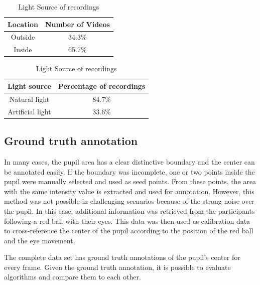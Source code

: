     \begin{table}[h]
      \centering 
      \begin{minipage}{0.7\textwidth}
        \centering
        \begin{tabular}{|c|c|}
          \hline
          Location & Number of Videos \\
          \hline
          Outside & 34.3\% \\
          Inside & 65.7\% \\
          \hline
        \end{tabular}
        \caption{Location of recordings}
        \label{tab:location}
      \end{minipage}\hfill
      \begin{minipage}{0.7\textwidth}
        \centering
        \begin{tabular}{|c|c|}
          \hline
          Light source & Percentage of recordings \\
          \hline
          Natural light & 84.7\% \\
          Artificial light & 33.6\% \\
          \hline
        \end{tabular}
        \caption{Light Source of recordings}
        \label{tab:light_source}
      \end{minipage}
    \end{table}

    \subsection{Ground truth annotation}
    \label{subsec:ground_truth}
    In many cases, the pupil area has a clear distinctive boundary and the center can be annotated easily. If the boundary was incomplete, one or two points inside the pupil were manually selected and used as seed points. From these points, the area with the same intensity value is extracted and used for annotation.  However, this method was not possible in challenging scenarios because of the strong noise over the pupil. In this case, additional information was retrieved from the participants following a red ball with their eyes. This data was then used as calibration data to cross-reference the center of the pupil according to the position of the red ball and the eye movement. 
    
    The complete data set has ground truth annotations of the pupil's center for every frame.
    Given the ground truth annotation, it is possible to evaluate algorithms and compare them to each other.
